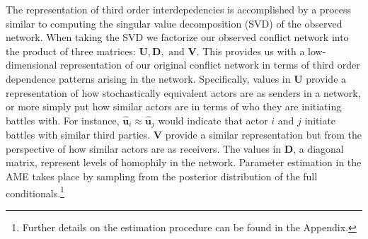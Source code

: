 The representation of third order interdepedencies is accomplished by a process similar to computing the singular value decomposition (SVD) of the observed network. When taking the SVD we factorize our observed conflict network into the product of three matrices: $\textbf{U}, \textbf{D}, \text{ and } \textbf{V}$. This provides us with a low-dimensional representation of our original conflict network in terms of third order dependence patterns arising in the network. Specifically, values in $\textbf{U}$ provide a representation of how stochastically equivalent actors are as senders in a network, or more simply put how similar actors are in terms of who they are initiating battles with. For instance, $\hat{\textbf{u}}_{i} \approx \hat{\textbf{u}}_{j}$ would indicate that actor $i$ and $j$ initiate battles with similar third parties. $\textbf{V}$ provide a similar representation but from the perspective of how similar actors are as receivers. The values in $\textbf{D}$, a diagonal matrix, represent levels of homophily in the network. Parameter estimation in the AME takes place by sampling from the posterior distribution of the full conditionals.\footnote{Further details on the estimation procedure can be found in the Appendix.}
